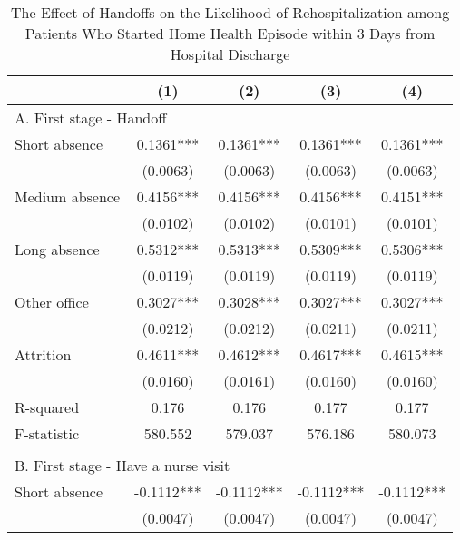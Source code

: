 \documentclass[final,12pt, notitlepage]{article}
\begin{document}
\begin{singlespace}
\begin{table}[H]
\footnotesize
\setlength\tabcolsep{0pt}
\centering
\caption{The Effect of Handoffs on the Likelihood of Rehospitalization among Patients Who Started Home Health Episode within 3 Days from Hospital Discharge}
\label{tab:iv_days_fromhospdc}
\begin{threeparttable}
{
\def\sym#1{\ifmmode^{#1}\else\(^{#1}\)\fi}
\begin{tabular*}{\textwidth}{l@{\extracolsep{\fill}}*{4}{c}} %
\toprule
                    &\multicolumn{1}{c}{(1)}&\multicolumn{1}{c}{(2)}&\multicolumn{1}{c}{(3)}&\multicolumn{1}{c}{(4)}\\
\midrule
\multicolumn{5}{l}{A. First stage - Handoff} \\
Short absence       &      0.1361***&      0.1361***&      0.1361***&      0.1361***\\
                    &    (0.0063)   &    (0.0063)   &    (0.0063)   &    (0.0063)   \\
Medium absence      &      0.4156***&      0.4156***&      0.4156***&      0.4151***\\
                    &    (0.0102)   &    (0.0102)   &    (0.0101)   &    (0.0101)   \\
Long absence        &      0.5312***&      0.5313***&      0.5309***&      0.5306***\\
                    &    (0.0119)   &    (0.0119)   &    (0.0119)   &    (0.0119)   \\
Other office        &      0.3027***&      0.3028***&      0.3027***&      0.3027***\\
                    &    (0.0212)   &    (0.0212)   &    (0.0211)   &    (0.0211)   \\
Attrition           &      0.4611***&      0.4612***&      0.4617***&      0.4615***\\
                    &    (0.0160)   &    (0.0161)   &    (0.0160)   &    (0.0160)   \\
R-squared           &       0.176   &       0.176   &       0.177   &       0.177   \\
F-statistic         &     580.552   &     579.037   &     576.186   &     580.073   \\
\\
\multicolumn{5}{l}{B. First stage - Have a nurse visit} \\
Short absence       &     -0.1112***&     -0.1112***&     -0.1112***&     -0.1112***\\
                    &    (0.0047)   &    (0.0047)   &    (0.0047)   &    (0.0047)   \\

\end{tabular*}}
\end{threeparttable}
\end{table}
\end{singlespace}
\end{document}
